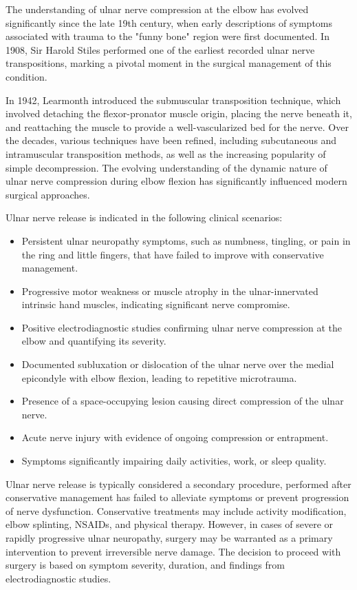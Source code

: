 The understanding of ulnar nerve compression at the elbow has evolved significantly since the late 19th century, when early descriptions of symptoms associated with trauma to the "funny bone" region were first documented. In 1908, Sir Harold Stiles performed one of the earliest recorded ulnar nerve transpositions, marking a pivotal moment in the surgical management of this condition.

In 1942, Learmonth introduced the submuscular transposition technique, which involved detaching the flexor-pronator muscle origin, placing the nerve beneath it, and reattaching the muscle to provide a well-vascularized bed for the nerve. Over the decades, various techniques have been refined, including subcutaneous and intramuscular transposition methods, as well as the increasing popularity of simple decompression. The evolving understanding of the dynamic nature of ulnar nerve compression during elbow flexion has significantly influenced modern surgical approaches.

Ulnar nerve release is indicated in the following clinical scenarios:

\begin{itemize}
  \item Persistent ulnar neuropathy symptoms, such as numbness, tingling, or pain in the ring and little fingers, that have failed to improve with conservative management.
  \item Progressive motor weakness or muscle atrophy in the ulnar-innervated intrinsic hand muscles, indicating significant nerve compromise.
  \item Positive electrodiagnostic studies confirming ulnar nerve compression at the elbow and quantifying its severity.
  \item Documented subluxation or dislocation of the ulnar nerve over the medial epicondyle with elbow flexion, leading to repetitive microtrauma.
  \item Presence of a space-occupying lesion causing direct compression of the ulnar nerve.
  \item Acute nerve injury with evidence of ongoing compression or entrapment.
  \item Symptoms significantly impairing daily activities, work, or sleep quality.
\end{itemize}

Ulnar nerve release is typically considered a secondary procedure, performed after conservative management has failed to alleviate symptoms or prevent progression of nerve dysfunction. Conservative treatments may include activity modification, elbow splinting, NSAIDs, and physical therapy. However, in cases of severe or rapidly progressive ulnar neuropathy, surgery may be warranted as a primary intervention to prevent irreversible nerve damage. The decision to proceed with surgery is based on symptom severity, duration, and findings from electrodiagnostic studies.

